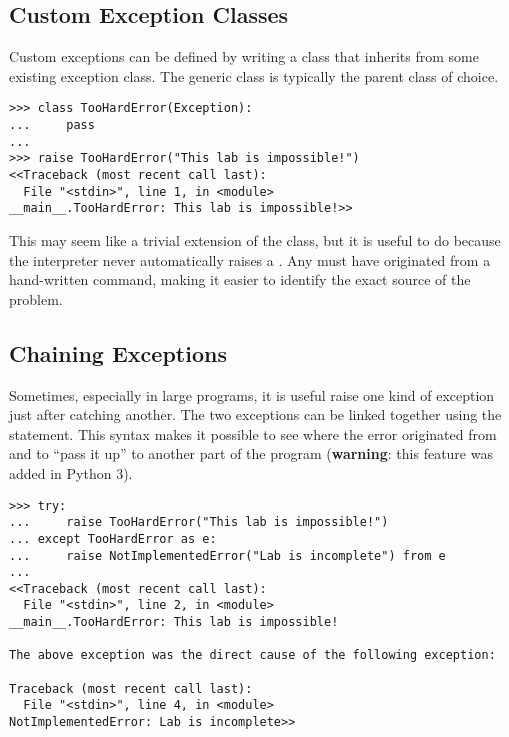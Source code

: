 \subsection*{Custom Exception Classes} %

Custom exceptions can be defined by writing a class that inherits from some existing exception class.
The generic  class is typically the parent class of choice.

\begin{lstlisting}
>>> class TooHardError(Exception):
...     pass
...
>>> raise TooHardError("This lab is impossible!")
<<Traceback (most recent call last):
  File "<stdin>", line 1, in <module>
__main__.TooHardError: This lab is impossible!>>
\end{lstlisting}

This may seem like a trivial extension of the  class, but it is useful to do because the interpreter never automatically raises a .
Any  must have originated from a hand-written  command, making it easier to identify the exact source of the problem.

\subsection*{Chaining Exceptions} %

Sometimes, especially in large programs, it is useful raise one kind of exception just after catching another.
The two exceptions can be linked together using the  statement.
This syntax makes it possible to see where the error originated from and to ``pass it up'' to another part of the program
(\textbf{warning}: this feature was added in Python 3).

\begin{lstlisting}
>>> try:
...     raise TooHardError("This lab is impossible!")
... except TooHardError as e:
...     raise NotImplementedError("Lab is incomplete") from e
...
<<Traceback (most recent call last):
  File "<stdin>", line 2, in <module>
__main__.TooHardError: This lab is impossible!

The above exception was the direct cause of the following exception:

Traceback (most recent call last):
  File "<stdin>", line 4, in <module>
NotImplementedError: Lab is incomplete>>
\end{lstlisting}

